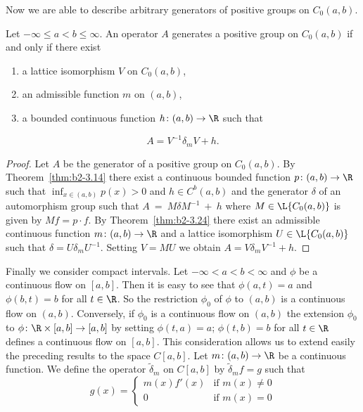 Now we are able to describe arbitrary generators of positive groups on $C_{0}(a,b)$.
\begin{theorem}\label{thm:b2-3.25}
%
Let $-\infty \leq a < b \leq \infty$.
An operator $A$ generates a positive group on $C_{0}(a,b)$ if and only if there exist
\begin{enumerate}[\upshape (i)]
\item 
a lattice isomorphism $V$ on $C_{0}(a,b)$,
\item 
an admissible function $m$ on $(a,b)$,
\item 
a bounded continuous function $h \colon (a,b) \to \R$ such that
\end{enumerate}
\begin{equation}\label{eq:b2-3.24}
A = V^{-1}\delta_{m}V + h.
\end{equation}
\end{theorem}
\begin{proof}
Let $A$ be the generator of a positive group on $C_{0}(a,b)$.
By Theorem~\ref{thm:b2-3.14} 
there exist a continuous bounded function $p \colon (a,b) \to \R$ such that $\inf_{x \in (a,b)} p(x) > 0$ and $h \in C^{b}(a,b)$ 
and the generator $\delta$ of an automorphism group such that $A~=~M\delta M^{-1}~+~h$ 
where $M \in \L{C_{0}(a,b)}$ is given by $Mf = p \cdot f$.
By Theorem~\ref{thm:b2-3.24} there exist an admissible continuous function $m \colon (a,b) \to \R$ and a lattice isomorphism $U \in \L{C_{0}(a,b)}$ such that $\delta = U\delta_{m}U^{-1}$.
Setting $V = MU$ we obtain $A = V\delta_{m}V^{-1} + h$.
\end{proof}
Finally we consider compact intervals.
Let $-\infty < a < b < \infty$ and $\phi$ be a continuous flow on $[a,b]$.
Then it is easy to see that $\phi(a,t) = a$ and $\phi(b,t) = b$ for all $t \in \R$.
So the restriction $\phi_{0}$ of\/ $\phi$ to $(a,b)$ is a continuous flow on $(a,b)$.
Conversely, if\/ $\phi_{0}$ is a continuous flow on $(a,b)$ the extension $\phi_{0}$ to $\phi \colon \R \times [a,b] \to [a,b]$ by setting $\phi(t,a) = a$; $\phi(t,b) = b$ for all $t \in \R$ defines a continuous flow on $[a,b]$.
This consideration allows us to extend easily the preceding results to the space $C[a,b]$.
Let $m \colon (a,b) \to \R$ be a continuous function.
We define the operator $\widetilde{\delta}_{m}$ on $C[a,b]$ by $\widetilde{\delta}_{m}f = g$ such that
\begin{equation}\label{eq:b2-3.25}
g(x) = \begin{cases}
    m(x)f'(x) & \text{if } m(x) \neq 0 \\
    0 & \text{if } m(x) = 0
\end{cases}
\end{equation}
